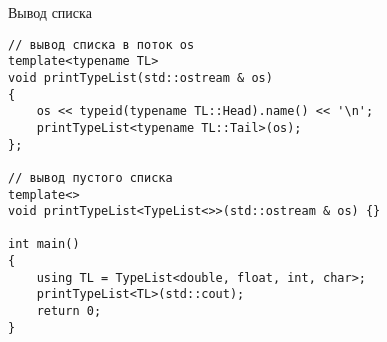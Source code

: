 \documentclass[aspectration=1610]{beamer}
\begin{document}
\begin{frame}[fragile]{Вывод списка}
\begin{lstlisting}
// вывод списка в поток os
template<typename TL>
void printTypeList(std::ostream & os)
{
    os << typeid(typename TL::Head).name() << '\n';
    printTypeList<typename TL::Tail>(os);
};

// вывод пустого списка
template<>
void printTypeList<TypeList<>>(std::ostream & os) {}

int main()
{
    using TL = TypeList<double, float, int, char>;
    printTypeList<TL>(std::cout);
    return 0;
}
\end{lstlisting}
\end{frame}
\end{document}
